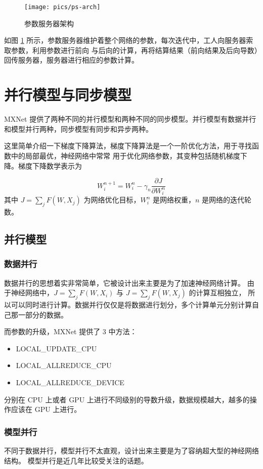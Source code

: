 \documentclass{ctexart}
\begin{document}
\begin{figure}
\centering
\texttt{[image: pics/ps-arch]}
\caption{参数服务器架构}
\label{fig:ps-arch}
\end{figure}

如图 \ref{fig:ps-arch} 所示，参数服务器维护着整个网络的参数，每次迭代中，工人向服务器索取参数，利用参数进行前向
与后向的计算，再将结算结果（前向结果及后向导数）回传服务器，服务器进行相应的参数计算。

\section{并行模型与同步模型}

MXNet 提供了两种不同的并行模型和两种不同的同步模型。并行模型有数据并行和模型并行两种，同步模型有同步和异步两种。

这里简单介绍一下梯度下降算法，梯度下降算法是一个一阶优化方法，用于寻找函数中的局部最优，神经网络中常常
用于优化网络参数，其变种包括随机梯度下降。梯度下降数学表示为

$$
W_i^{n+1} = W_i^{n} - \gamma_n \frac {\partial J} {\partial W_i^{n}} 
$$
其中 $J = \sum_j F(W, X_j)$ 为网络优化目标，$W_i^{n}$ 是网络权重，$n$ 是网络的迭代轮数。

\subsection{并行模型}

\subsubsection{数据并行}
数据并行的思想着实非常简单，它被设计出来主要是为了加速神经网络计算。
由于神经网络中，$J = \sum_j F(W, X_i)$ 与 $J = \sum_j F(W, X_j)$ 的计算互相独立，
所以可以同时进行计算。数据并行仅仅是将数据进行划分，多个计算单元分别计算自己那一部分的数据。

而参数的升级，MXNet 提供了 3 中方法：
\begin{itemize}
	\item LOCAL\_UPDATE\_CPU
	\item LOCAL\_ALLREDUCE\_CPU
	\item LOCAL\_ALLREDUCE\_DEVICE
\end{itemize}
分别在 CPU 上或者 GPU 上进行不同级别的导数升级，数据规模越大，越多的操作应该在 GPU 上进行。

\subsubsection{模型并行}
不同于数据并行，模型并行不太直观，设计出来主要是为了容纳超大型的神经网络结构。
模型并行是近几年比较受关注的话题。
\end{document}
